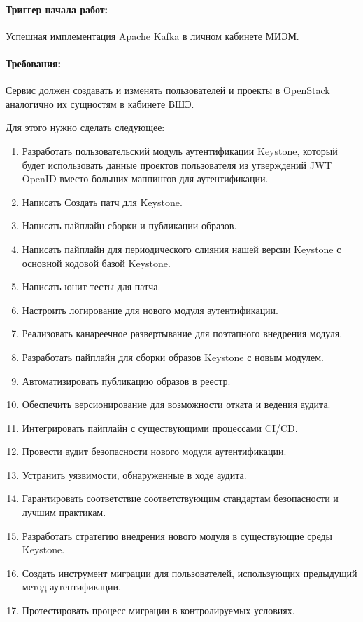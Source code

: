 \documentclass[14pt, a4paper]{extarticle}
\begin{document}
\paragraph{Триггер начала работ:} 
Успешная имплементация Apache Kafka в личном кабинете МИЭМ.
\paragraph{Требования:} 
Сервис должен создавать и изменять пользователей и проекты в OpenStack аналогично их сущностям в кабинете ВШЭ.

Для этого нужно сделать следующее:

\begin{enumerate}
\item Разработать пользовательский модуль аутентификации Keystone, который будет использовать данные проектов пользователя из утверждений JWT OpenID вместо больших маппингов для аутентификации.
\item Написать Создать патч для Keystone.
\item Написать пайплайн сборки и публикации образов.
\item Написать пайплайн для периодического слияния нашей версии Keystone с основной кодовой базой Keystone.
\item Написать юнит-тесты для патча.
\item Настроить логирование для нового модуля аутентификации.
\item Реализовать канареечное развертывание для поэтапного внедрения модуля.
\item Разработать пайплайн для сборки образов Keystone с новым модулем.
\item Автоматизировать публикацию образов в реестр.
\item Обеспечить версионирование для возможности отката и ведения аудита.
\item Интегрировать пайплайн с существующими процессами CI/CD.
\item Провести аудит безопасности нового модуля аутентификации.
\item Устранить уязвимости, обнаруженные в ходе аудита.
\item Гарантировать соответствие соответствующим стандартам безопасности и лучшим практикам.
\item Разработать стратегию внедрения нового модуля в существующие среды Keystone.
\item Создать инструмент миграции для пользователей, использующих предыдущий метод аутентификации.
\item Протестировать процесс миграции в контролируемых условиях.
\end{enumerate}
\end{document}

